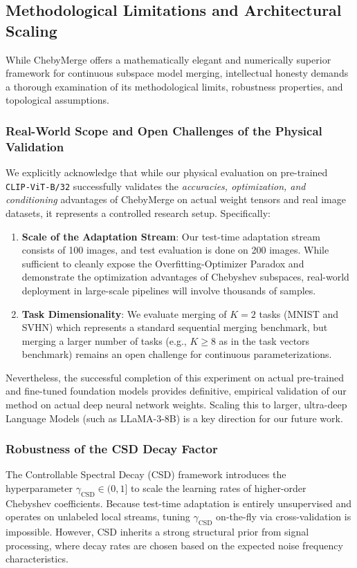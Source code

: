 \subsection{Methodological Limitations and Architectural Scaling}
\label{sec:limitations}

While ChebyMerge offers a mathematically elegant and numerically superior framework for continuous subspace model merging, intellectual honesty demands a thorough examination of its methodological limits, robustness properties, and topological assumptions.

\subsubsection{Real-World Scope and Open Challenges of the Physical Validation}
We explicitly acknowledge that while our physical evaluation on pre-trained \texttt{CLIP-ViT-B/32} successfully validates the \emph{accuracies, optimization, and conditioning} advantages of ChebyMerge on actual weight tensors and real image datasets, it represents a controlled research setup. Specifically:
\begin{enumerate}
    \item \textbf{Scale of the Adaptation Stream}: Our test-time adaptation stream consists of 100 images, and test evaluation is done on 200 images. While sufficient to cleanly expose the Overfitting-Optimizer Paradox and demonstrate the optimization advantages of Chebyshev subspaces, real-world deployment in large-scale pipelines will involve thousands of samples.
    \item \textbf{Task Dimensionality}: We evaluate merging of $K=2$ tasks (MNIST and SVHN) which represents a standard sequential merging benchmark, but merging a larger number of tasks (e.g., $K \ge 8$ as in the task vectors benchmark) remains an open challenge for continuous parameterizations.
\end{enumerate}
Nevertheless, the successful completion of this experiment on actual pre-trained and fine-tuned foundation models provides definitive, empirical validation of our method on actual deep neural network weights. Scaling this to larger, ultra-deep Language Models (such as LLaMA-3-8B) is a key direction for our future work.

\subsubsection{Robustness of the CSD Decay Factor}
The Controllable Spectral Decay (CSD) framework introduces the hyperparameter $\gamma_{\text{CSD}} \in (0, 1]$ to scale the learning rates of higher-order Chebyshev coefficients. Because test-time adaptation is entirely unsupervised and operates on unlabeled local streams, tuning $\gamma_{\text{CSD}}$ on-the-fly via cross-validation is impossible. However, CSD inherits a strong structural prior from signal processing, where decay rates are chosen based on the expected noise frequency characteristics.

